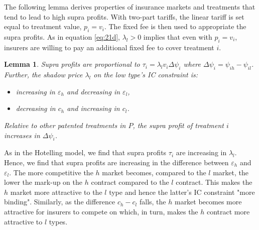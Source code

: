 \documentclass[a4paper,12pt]{article}
\newtheorem{lemma}{Lemma}
\begin{document}
The following lemma derives properties of insurance markets and treatments that tend to lead to high supra profits. With two-part tariffs, the linear tariff is set equal to treatment value, \(p_i=v_i\). The fixed fee is then used to appropriate the supra profits. As in equation \eqref{eq:21d}, \(\lambda_l>0\) implies that even with \(p_i=v_i\), insurers are willing to pay an additional fixed fee to cover treatment \(i\).

\begin{lemma}
\label{Comparative_static_lambda}
Supra profits are proportional to \(\tau_i = \lambda_l v_i \Delta \psi_i\) where \(\Delta \psi_{i} = \psi_{ih} - \psi_{il}\). Further, the shadow price \(\lambda_l\) on the low type's IC constraint is:
\begin{itemize}
\item increasing in \(\varepsilon_h\) and decreasing in \(\varepsilon_l\),
\item decreasing in \(c_h\) and increasing in \(c_l\).
\end{itemize}

Relative to other patented treatments in \(P\), the supra profit of treatment \(i\) increases in \(\Delta \psi_i\).
\end{lemma}

As in the Hotelling model, we find that supra profits \(\tau_i\) are increasing in \(\lambda_l\). Hence, we find that supra profits are increasing in the difference between \(\varepsilon_h\) and \(\varepsilon_l\). The more competitive the \(h\) market becomes, compared to the \(l\) market, the lower the mark-up on the \(h\) contract compared to the \(l\) contract. This makes the \(h\) market more attractive to the \(l\) type and hence the latter's IC constraint "more binding". Similarly, as the difference \(c_h-c_l\) falls, the \(h\) market becomes more attractive for insurers to compete on which, in turn, makes the \(h\) contract more attractive to \(l\) types.
\end{document}
